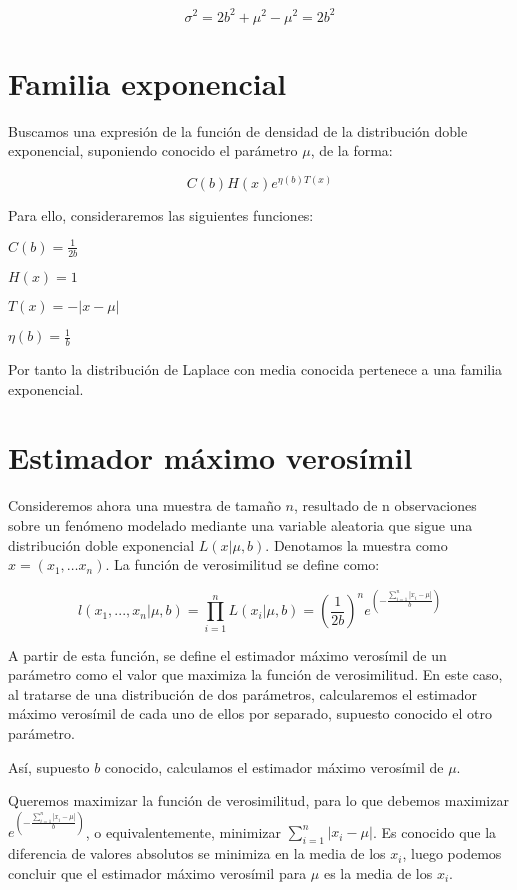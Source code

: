 \documentclass[a4paper, 10pt]{article} %
\begin{document}
		$$\sigma^2=2b^2 + \mu^2 - \mu^2=2b^2$$

\section{Familia exponencial}

	Buscamos una expresión de la función de densidad de la distribución doble exponencial, suponiendo conocido el parámetro
	$\mu$, de la forma:
	
	$$C\left(b\right)H(x)e^{\eta(b)T(x)}$$
	
	Para ello, consideraremos las siguientes funciones: 

	\begin{description}
		\item$C\left(b\right) = \frac{1}{2b} $
		\item$H(x) = 1$
		\item$T(x) = -|x-\mu|$
		\item$\eta(b) = \frac{1}{b}$
	\end{description}
	
	Por tanto la distribución de Laplace con media conocida pertenece a una familia exponencial. 

\section{Estimador máximo verosímil}

	Consideremos ahora una muestra de tamaño $n$, resultado de n observaciones sobre un fenómeno modelado
	mediante una variable aleatoria que sigue una distribución doble exponencial $L(x|\mu, b)$. Denotamos
	la muestra como $x = \left(x_1, \dots x_n\right)$. La función de verosimilitud se define como:
	
	$$l(x_1,...,x_n|\mu, b)=\prod_{i=1}^{n} L(x_i|\mu, b) = \left(\frac{1}{2b}\right)^n 
	e^{\left(-\frac{\sum_{i=1}^{n}|x_i-\mu|}{b}\right)}$$
	
	A partir de esta función, se define el estimador máximo verosímil de un parámetro como el valor que
	maximiza la función de verosimilitud. En este caso, al tratarse de una distribución de dos parámetros,
	calcularemos el estimador máximo verosímil de cada uno de ellos por separado, supuesto conocido el otro parámetro. 
	
	Así, supuesto $b$ conocido, calculamos el estimador máximo verosímil de $\mu$. 
	
	Queremos maximizar la función de verosimilitud, para lo que debemos maximizar $e^{\left(-\frac{\sum_{i=1}^{n}|x_i-\mu|}{b}\right)}$,
	o equivalentemente, minimizar $\sum_{i=1}^{n}|x_i-\mu|$. Es conocido que la diferencia de valores absolutos se minimiza
	en la media de los $x_i$, luego podemos concluir que el estimador máximo verosímil para $\mu$ es la media de los $x_i$. 
	
\end{document}
